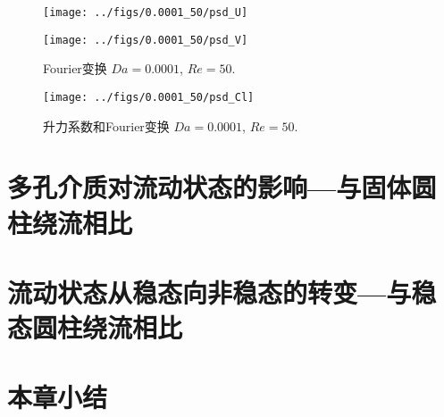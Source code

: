 \begin{figure}[]
	\centering
	\begin{minipage}{\textwidth}
		\centering
		\texttt{[image: ../figs/0.0001\_50/psd\_U]}
	\end{minipage}
	\centering
	\begin{minipage}{\textwidth}
		\centering
		\texttt{[image: ../figs/0.0001\_50/psd\_V]}
	\end{minipage}
	\caption{Fourier变换 $Da=0.0001$, $Re=50$.}
\end{figure}

\begin{figure}
	\centering
	\texttt{[image: ../figs/0.0001\_50/psd\_Cl]}
	\caption{升力系数和Fourier变换 $Da=0.0001$, $Re=50$.}
\end{figure}

\section{多孔介质对流动状态的影响---与固体圆柱绕流相比}

\section{流动状态从稳态向非稳态的转变---与稳态圆柱绕流相比}

\section{本章小结}
